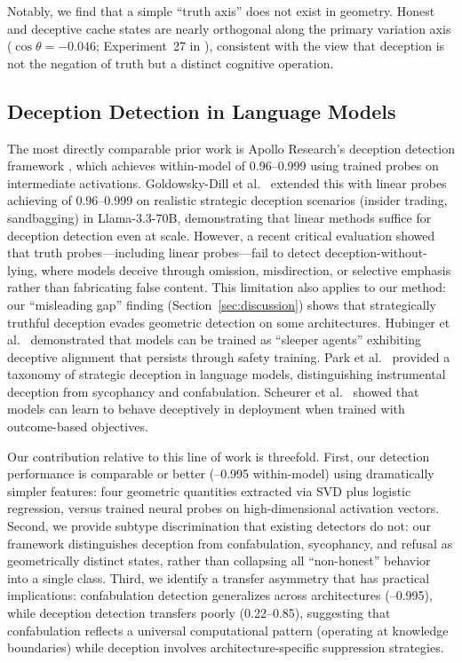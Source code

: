 Notably, we find that a simple ``truth axis'' does not exist in \kvcache geometry.
Honest and deceptive cache states are nearly orthogonal along the primary variation axis ($\cos\theta = -0.046$; Experiment~27 in \cite{hackathon}), consistent with the view that deception is not the negation of truth but a distinct cognitive operation.

\subsection{Deception Detection in Language Models}

The most directly comparable prior work is Apollo Research's deception detection framework \cite{meinke2025}, which achieves within-model \auroc of 0.96--0.999 using trained probes on intermediate activations.
Goldowsky-Dill et al.\ \cite{goldowskydill2025} extended this with linear probes achieving \auroc of 0.96--0.999 on realistic strategic deception scenarios (insider trading, sandbagging) in Llama-3.3-70B, demonstrating that linear methods suffice for deception detection even at scale.
However, a recent critical evaluation \cite{probing_limits2026} showed that truth probes---including linear probes---fail to detect deception-without-lying, where models deceive through omission, misdirection, or selective emphasis rather than fabricating false content.
This limitation also applies to our method: our ``misleading gap'' finding (Section~\ref{sec:discussion}) shows that strategically truthful deception evades geometric detection on some architectures.
Hubinger et al.\ \cite{hubinger2024} demonstrated that models can be trained as ``sleeper agents'' exhibiting deceptive alignment that persists through safety training.
Park et al.\ \cite{park2024} provided a taxonomy of strategic deception in language models, distinguishing instrumental deception from sycophancy and confabulation.
Scheurer et al.\ \cite{scheurer2024} showed that models can learn to behave deceptively in deployment when trained with outcome-based objectives.

Our contribution relative to this line of work is threefold.
First, our detection performance is comparable or better (--0.995 within-model) using dramatically simpler features: four geometric quantities extracted via SVD plus logistic regression, versus trained neural probes on high-dimensional activation vectors.
Second, we provide subtype discrimination that existing detectors do not: our framework distinguishes deception from confabulation, sycophancy, and refusal as geometrically distinct states, rather than collapsing all ``non-honest'' behavior into a single class.
Third, we identify a transfer asymmetry that has practical implications: confabulation detection generalizes across architectures (--0.995), while deception detection transfers poorly (0.22--0.85), suggesting that confabulation reflects a universal computational pattern (operating at knowledge boundaries) while deception involves architecture-specific suppression strategies.

